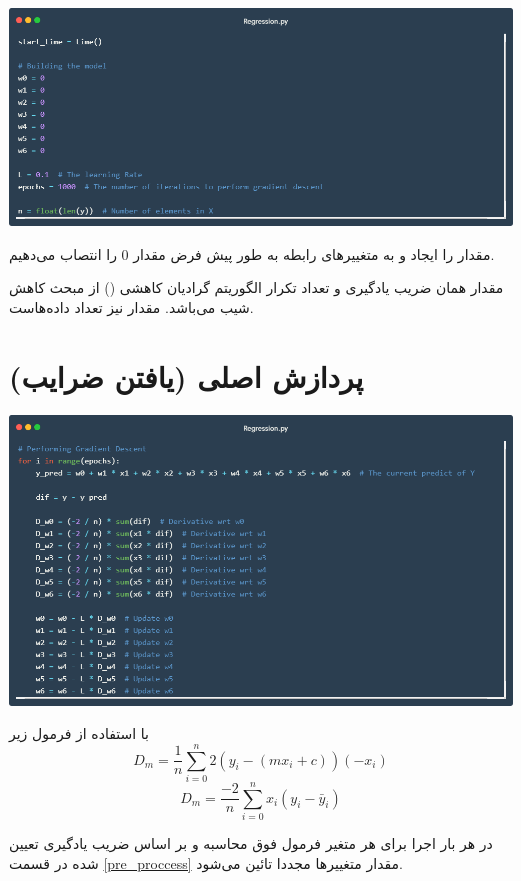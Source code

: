 \documentclass[12pt, dvipsnames, svgnames, x11names,]{article}
\begin{document}
		\includegraphics[width=14cm]{images/code06} \par
		{\normalsize 
			مقدار  را ایجاد و به متغییرهای رابطه به طور پیش فرض مقدار 0 را انتصاب می‌دهیم.
			
			مقدار  همان ضریب یادگیری و  تعداد تکرار الگوریتم گرادیان کاهشی () از مبحث کاهش شیب می‌باشد.
			مقدار  نیز تعداد داده‌هاست.
		}
		
			
		
		
	\section{پردازش اصلی (یافتن ضرایب)}
		
		\includegraphics[width=14cm]{images/code07} \vspace{2mm} \par
		{\normalsize 
			با استفاده از فرمول زیر
			\[ D_m = \frac{1}{n} \sum_{i=0}^n 2(y_i - (mx_i + c))(-x_i) \] \[ D_m = \frac{-2}{n} \sum_{i=0}^n x_i(y_i - \bar y_i) \]
			
			در هر بار اجرا برای هر متغیر فرمول فوق محاسبه و بر اساس ضریب یادگیری تعیین شده در قسمت \ref{pre_proccess} مقدار متغییرها مجددا تائین می‌شود.
		}
	
\end{document}
